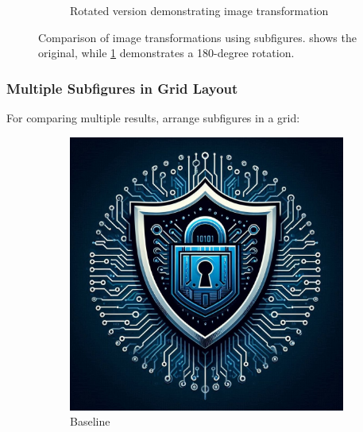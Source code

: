 \begin{figure}[htbp]
\begin{subfigure}[b]{0.45\textwidth}
        \caption{Rotated version demonstrating image transformation}
        \label{fig:logo_rotated}
    \end{subfigure}
    \caption{Comparison of image transformations using subfigures.  shows the original, while \cref{fig:logo_rotated} demonstrates a 180-degree rotation.}
    \label{fig:logo_comparison}
\end{figure}

\subsubsection{Multiple Subfigures in Grid Layout}

For comparing multiple results, arrange subfigures in a grid:

\begin{figure}[htbp]
    \centering
    \begin{subfigure}[b]{0.3\textwidth}
        \centering
        \includegraphics[width=\textwidth]{content/images/logo.jpg}
        \caption{Baseline}
        \label{fig:grid_baseline}
    \end{subfigure}
    \hfill
    \begin{subfigure}[b]{0.3\textwidth}
        \centering

\end{subfigure}
\end{figure}
